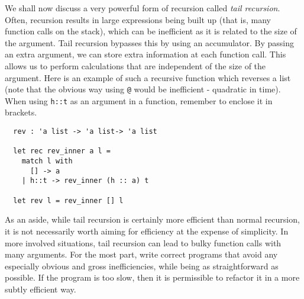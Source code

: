 \documentclass[12pt]{article}
\begin{document}
We shall now discuss a very powerful form of recursion called \textit{tail recursion}. Often, recursion results in
large expressions being built up (that is, many function calls on the stack), which can be inefficient as it is related to the
size of the argument. Tail recursion
bypasses this by using an accumulator. By passing an extra argument, we can store extra information at each function
call. This allows us to perform calculations that are independent of the size of the argument. Here is an example of
such a recursive function which reverses a list (note that the obvious way using \texttt{@} would be inefficient - quadratic in time).
When using \texttt{h::t} as an argument in a function, remember to enclose it in brackets.
\begin{lstlisting}
  rev : 'a list -> 'a list-> 'a list

  let rec rev_inner a l =
    match l with
      [] -> a
    | h::t -> rev_inner (h :: a) t

  let rev l = rev_inner [] l
\end{lstlisting}

As an aside, while tail recursion is certainly more efficient than normal recursion, it is not necessarily worth
aiming for efficiency at the expense of simplicity. In more involved situations, tail recursion can lead
to bulky function calls with many arguments. For the most part, write correct programs that avoid any
especially obvious and gross inefficiencies, while being as straightforward as possible. If the program is
too slow, then it is permissible to refactor it in a more subtly efficient way.
\end{document}
